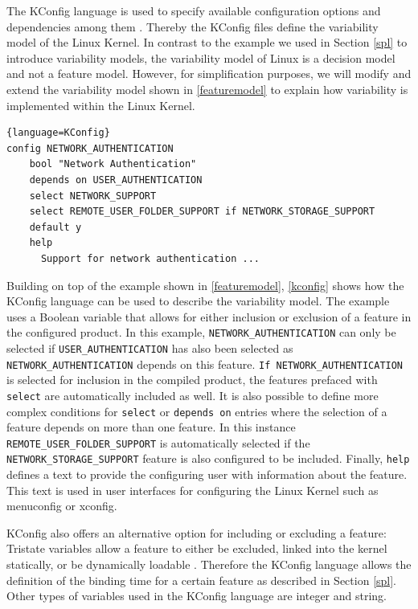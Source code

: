\documentclass[a4paper]{article}
\begin{document}
The KConfig language is used to specify available configuration options and dependencies among them \cite{variabilitymodel-linux}. Thereby the KConfig files define the variability model of the Linux Kernel. In contrast to the example we used in Section \ref{spl} to introduce variability models, the variability model of Linux is a decision model and not a feature model. However, for simplification purposes, we will modify and extend the variability model shown in \autoref{featuremodel} to explain how variability is implemented within the Linux Kernel. 

\begin{lstlisting}[caption= KConfig Language, label=kconfig]{language=KConfig}
config NETWORK_AUTHENTICATION
	bool "Network Authentication"
	depends on USER_AUTHENTICATION
	select NETWORK_SUPPORT
	select REMOTE_USER_FOLDER_SUPPORT if NETWORK_STORAGE_SUPPORT
	default y
	help
	  Support for network authentication ...
\end{lstlisting}
 
Building on top of the example shown in \autoref{featuremodel}, \autoref{kconfig} shows how the KConfig language can be used to describe the variability model. The example uses a Boolean variable that allows for either inclusion or exclusion of a feature in the configured product.
In this example, \texttt{NETWORK\_\-AUTHENTICATION} can only be selected if \texttt{USER\_\-AUTHENTICATION} has also been selected as \texttt{NETWORK\_\-AUTHENTICATION} depends on this feature. \texttt{If NETWORK\_\-AUTHENTICATION} is selected for inclusion in the compiled product, the features prefaced with \texttt{select} are automatically included as well. It is also possible to define more complex conditions for \texttt{select} or \texttt{depends on} entries where the selection of a feature depends on more than one feature. In this instance \texttt{REMOTE\-\_USER\_\-FOLDER\_\-SUPPORT} is automatically selected if the \texttt{NETWORK\_\-STORAGE\-\_SUPPORT} feature is also configured to be included. Finally, \texttt{help} defines a text to provide the configuring user with information about the feature. This text is used in user interfaces for configuring the Linux Kernel such as menuconfig or xconfig.

 KConfig also offers an alternative option for including or excluding a feature: Tristate variables allow a feature to either be excluded, linked into the kernel statically, or be dynamically loadable \cite{variabilitymodel-linux}. Therefore the KConfig language allows the definition of the binding time for a certain feature as described in Section \ref{spl}. Other types of variables used in the KConfig language are integer and string.
\end{document}
